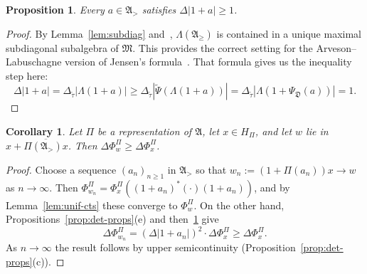 \documentclass[12pt,a4paper]{article}
\numberwithin{equation}{section}
\newtheorem{prop}[thm]{Proposition}
\newtheorem{cor}[thm]{Corollary}
\theoremstyle{remark}
\newcommand{\A}{\mathfrak{A}}
\newcommand{\frD}{\mathfrak{D}}
\newcommand{\M}{\mathfrak{M}}
\renewcommand{\L}{\Lambda}
\newcommand{\ol}[1]{\overline{#1}}
\renewcommand{\t}[1]{\widetilde{#1}}
\begin{document}
\begin{prop}\label{prop:Jensen}
Every $a \in \A_>$ satisfies $\Delta |1 + a| \ge 1$.
\end{prop}

\begin{proof}
By Lemma~\ref{lem:subdiag} and~\cite[Thm. 2.2.1]{Arv67}, $\L(\A_\ge)$ is contained in a unique maximal subdiagonal subalgebra of $\M$.  This provides the correct setting for the Arveson--Labuschagne version of Jensen's formula~\cite[Thm. 3]{Lab05}.  That formula gives us the inequality step here:
\[\Delta |1 + a| = \Delta_{\t{\tau}} |\L(1 + a)| \ge \Delta_{\t{\tau}} |\t{\Psi}(\L(1 + a))| = \Delta_{\t{\tau}}|\L(1 + \Psi_\frD(a))|  = 1.\]
\end{proof}

\begin{cor}\label{cor:shear}
Let $\Pi$ be a representation of $\A$, let $x \in H_\Pi$, and let $w$ lie in $x + \ol{\Pi(\A_>)x}$.  Then $\Delta \Phi^\Pi_w \ge \Delta \Phi^\Pi_x$.
\end{cor}

\begin{proof}
Choose a sequence $(a_n)_{n\ge 1}$ in $\A_>$ so that $w_n := (1 + \Pi(a_n))x \to w$ as $n\to\infty$.  Then $\Phi^\Pi_{w_n} = \Phi^\Pi_x((1+a_n)^\ast(\cdot)(1+a_n))$, and by Lemma~\ref{lem:unif-cts} these converge to $\Phi^\Pi_w$.  On the other hand, Propositions~\ref{prop:det-props}(e) and then~\ref{prop:Jensen} give
\[\Delta \Phi^\Pi_{w_n}= (\Delta|1 + a_n|)^2\cdot \Delta \Phi^\Pi_x  \ge \Delta \Phi^\Pi_x.\]
As $n\to\infty$ the result follows by upper semicontinuity (Proposition~\ref{prop:det-props}(c)).
\end{proof}
\end{document}
